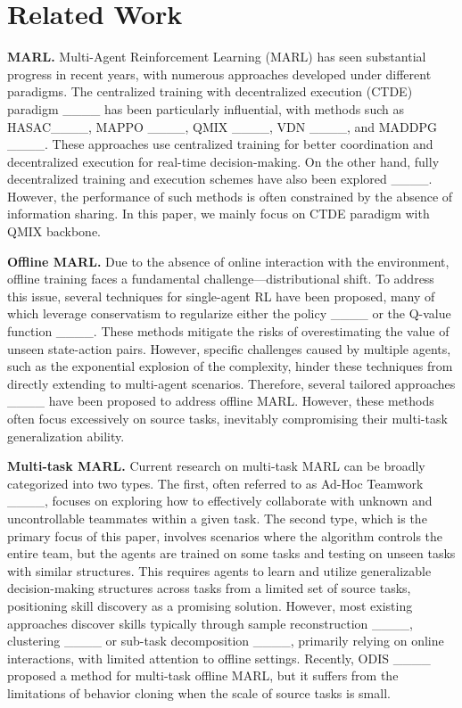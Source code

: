 \section{Related Work}
\textbf{MARL.} Multi-Agent Reinforcement Learning (MARL) has seen substantial progress in recent years, with numerous approaches developed under different paradigms. The centralized training with decentralized execution (CTDE) paradigm ____ has been particularly influential, with methods such as HASAC____, MAPPO ____, QMIX ____, VDN ____, and MADDPG ____. These approaches use centralized training for better coordination and decentralized execution for real-time decision-making. On the other hand, fully decentralized training and execution schemes have also been explored ____. However, the performance of such methods is often constrained by the absence of information sharing. In this paper, we mainly focus on CTDE paradigm with QMIX backbone.

\textbf{Offline MARL.} 
 Due to the absence of online interaction with the environment, offline training faces a fundamental challenge—distributional shift. To address this issue, several techniques for single-agent RL have been proposed, many of which leverage conservatism to regularize either the policy ____ or the Q-value function ____. These methods mitigate the risks of overestimating the value of unseen state-action pairs. However, specific challenges caused by multiple agents, such as the exponential explosion of the complexity, hinder these techniques from directly extending to multi-agent scenarios. Therefore, several tailored approaches ____ have been proposed to address offline MARL. However, these methods often focus excessively on source tasks, inevitably compromising their multi-task generalization ability.

\textbf{Multi-task MARL.} 
Current research on multi-task MARL can be broadly categorized into two types. The first, often referred to as Ad-Hoc Teamwork ____, focuses on exploring how to effectively collaborate with unknown and uncontrollable teammates within a given task. The second type, which is the primary focus of this paper, involves scenarios where the algorithm controls the entire team, but the agents are trained on some tasks and testing on unseen tasks with similar structures. This requires agents to learn and utilize generalizable decision-making structures across tasks from a limited set of source tasks, positioning skill discovery as a promising solution. However, most existing approaches discover skills typically through sample reconstruction ____, clustering ____ or sub-task decomposition ____, primarily relying on online interactions, with limited attention to offline settings. Recently, ODIS ____ proposed a method for multi-task offline MARL, but it suffers from the limitations of behavior cloning when the scale of source tasks is small.